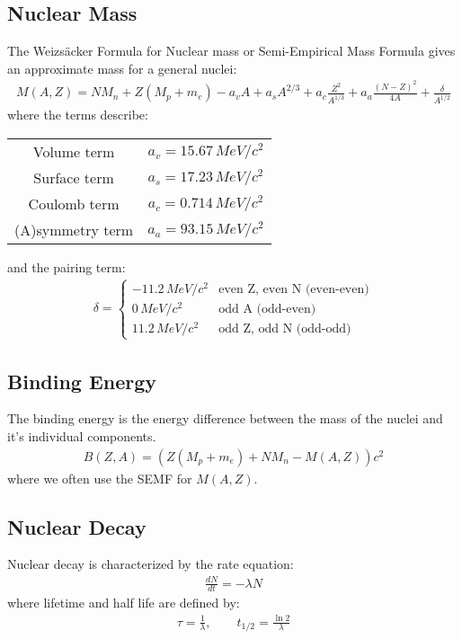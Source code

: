 \documentclass{article}
\numberwithin{equation}{section}
\begin{document}
\subsection{Nuclear Mass}
The Weizs\"acker Formula for Nuclear mass or Semi-Empirical Mass Formula gives an approximate mass for a general nuclei:
\begin{align}
M(A,Z) = N M_n + Z(M_p + m_e) - a_v A + a_s A^{2/3} + a_c \frac{Z^2}{A^{1/3}} + a_a \frac{(N-Z)^2}{4A} + \frac{\delta}{A^{1/2}}
\end{align}
where the terms describe:
\begin{center}
\begin{tabular}{ c c }
Volume term & $a_v = 15.67 \, \si{MeV/c^2}$ \\
Surface term & $a_s = 17.23 \, \si{MeV/c^2}$ \\
Coulomb term & $a_c = 0.714 \, \si{MeV/c^2}$ \\
(A)symmetry term & $a_a = 93.15 \, \si{MeV/c^2}$
\end{tabular}
\end{center}
and the pairing term:
\begin{align}
\delta = \begin{cases}
-11.2 \, \si{MeV/c^2} & \text{even Z, even N (even-even)} \\
0 \, \si{MeV/c^2} & \text{odd A (odd-even)} \\
11.2 \, \si{MeV/c^2} & \text{odd Z, odd N (odd-odd)} 
\end{cases}
\end{align}

\subsection{Binding Energy}
The binding energy is the energy difference between the mass of the nuclei and it's individual components.
\begin{align}
B(Z,A) = \left( Z(M_p + m_e) + N M_n - M(A,Z) \right)c^2
\end{align}
where we often use the SEMF for $M(A,Z)$.

\subsection{Nuclear Decay}
Nuclear decay is characterized by the rate equation:
\begin{align}
\frac{dN}{dt} = - \lambda N
\end{align}
where lifetime and half life are defined by:
\begin{align}
\tau = \frac{1}{\lambda} ,\qquad t_{1/2} = \frac{\ln 2}{\lambda}
\end{align}
\end{document}
